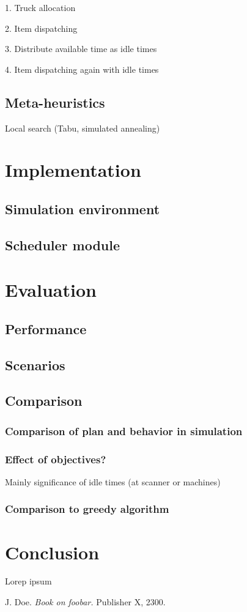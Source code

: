 \documentclass{ctuthesis}
\begin{document}
1. Truck allocation

2. Item dispatching

3. Distribute available time as idle times

4. Item dispatching again with idle times

\section{Meta-heuristics}
Local search (Tabu, simulated annealing)

\chapter{Implementation}
\section{Simulation environment}
\section{Scheduler module}
\chapter{Evaluation}
\section{Performance}
\section{Scenarios}
\section{Comparison}
\subsection{Comparison of plan and behavior in simulation}
\subsection{Effect of objectives?}
Mainly significance of idle times (at scanner or machines)
\subsection{Comparison to greedy algorithm}
\chapter{Conclusion}

Lorep ipsum \cite{doe}

\begin{thebibliography}{1}

 J. Doe. \emph{Book on foobar.} Publisher X,
 2300.

\end{thebibliography}
\end{document}
